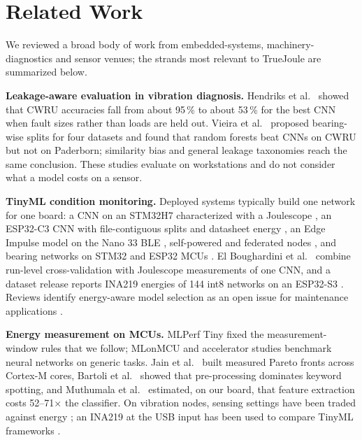 \documentclass[conference]{IEEEtran}
\newcommand{\TJ}{TrueJoule}
\begin{document}
\section{Related Work}\label{sec:related}
We reviewed a broad body of work from embedded-systems, machinery-diagnostics and sensor venues; the strands most
relevant to \TJ{} are summarized below.

\textbf{Leakage-aware evaluation in vibration diagnosis.} Hendriks et al.\ \cite{hendriks2022towards} showed that CWRU
accuracies fall from about 95\,\% to about 53\,\% for the best CNN when fault sizes rather than loads are held out.
Vieira et al.\ \cite{vieira2026towards} proposed bearing-wise splits for four datasets and found that random forests
beat CNNs on CWRU but not on Paderborn; similarity bias \cite{varejao2025similarity} and general leakage taxonomies \cite{kapoor2023leakage} reach the same
conclusion.
These studies evaluate on workstations and do not consider what a model costs on a sensor.

\textbf{TinyML condition monitoring.} Deployed systems typically build one network for one board: a CNN on an STM32H7
characterized with a Joulescope \cite{shoba2026whispernet}, an ESP32-C3 CNN with file-contiguous splits and datasheet
energy \cite{banerjee2026ondevice}, an Edge Impulse model on the Nano 33 BLE \cite{lima2025edgeimpulse},
self-powered and federated nodes \cite{chen2023lopdm,sairam2026tinycommfl}, and bearing networks on STM32 and ESP32
MCUs \cite{fort2023bearing,asutkar2023tinyml,gao2025edge}. El Boughardini et al.\ \cite{elboughardini2026effective}
combine run-level cross-validation with Joulescope measurements of one CNN, and a dataset release reports INA219
energies of 144 int8 networks on an ESP32-S3 \cite{gupta2026measured}. Reviews identify energy-aware model
selection as an open issue for maintenance applications \cite{danane2025tinyml,alharthi2026tinyml}.

\textbf{Energy measurement on MCUs.} MLPerf Tiny \cite{banbury2021mlperf} fixed the measurement-window rules that we
follow; MLonMCU \cite{vankempen2023mlonmcu} and accelerator studies \cite{huang2024energy} benchmark neural networks on
generic tasks. Jain et al.\ \cite{jain2025pareto} built measured Pareto fronts across Cortex-M cores, Bartoli et
al.\ \cite{bartoli2025endtoend,bartoli2025benchmarking} showed that pre-processing dominates keyword spotting, and
Muthumala et al.\ \cite{muthumala2024comparison} estimated, on our board, that feature extraction costs 52--71$\times$
the classifier. On vibration nodes, sensing settings have been traded against energy \cite{ragusa2025sensing}; an INA219 at the USB input has been used to compare TinyML frameworks
\cite{quispe2026assessing}.
\end{document}
